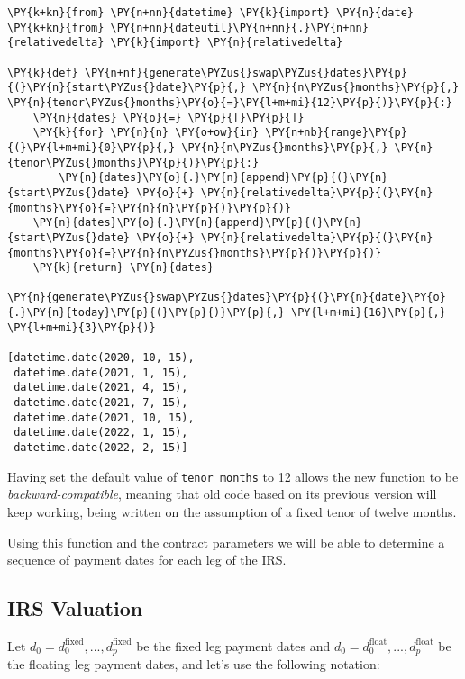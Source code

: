 \begin{codebox}[breakable, size=fbox, boxrule=1pt, pad at break*=1mm,colback=cellbackground, colframe=cellborder]
\begin{Verbatim}[commandchars=\\\{\}]
\PY{k+kn}{from} \PY{n+nn}{datetime} \PY{k}{import} \PY{n}{date}
\PY{k+kn}{from} \PY{n+nn}{dateutil}\PY{n+nn}{.}\PY{n+nn}{relativedelta} \PY{k}{import} \PY{n}{relativedelta}
    
\PY{k}{def} \PY{n+nf}{generate\PYZus{}swap\PYZus{}dates}\PY{p}{(}\PY{n}{start\PYZus{}date}\PY{p}{,} \PY{n}{n\PYZus{}months}\PY{p}{,} \PY{n}{tenor\PYZus{}months}\PY{o}{=}\PY{l+m+mi}{12}\PY{p}{)}\PY{p}{:}
    \PY{n}{dates} \PY{o}{=} \PY{p}{[}\PY{p}{]}
    \PY{k}{for} \PY{n}{n} \PY{o+ow}{in} \PY{n+nb}{range}\PY{p}{(}\PY{l+m+mi}{0}\PY{p}{,} \PY{n}{n\PYZus{}months}\PY{p}{,} \PY{n}{tenor\PYZus{}months}\PY{p}{)}\PY{p}{:}
        \PY{n}{dates}\PY{o}{.}\PY{n}{append}\PY{p}{(}\PY{n}{start\PYZus{}date} \PY{o}{+} \PY{n}{relativedelta}\PY{p}{(}\PY{n}{months}\PY{o}{=}\PY{n}{n}\PY{p}{)}\PY{p}{)}
    \PY{n}{dates}\PY{o}{.}\PY{n}{append}\PY{p}{(}\PY{n}{start\PYZus{}date} \PY{o}{+} \PY{n}{relativedelta}\PY{p}{(}\PY{n}{months}\PY{o}{=}\PY{n}{n\PYZus{}months}\PY{p}{)}\PY{p}{)}
    \PY{k}{return} \PY{n}{dates}

\PY{n}{generate\PYZus{}swap\PYZus{}dates}\PY{p}{(}\PY{n}{date}\PY{o}{.}\PY{n}{today}\PY{p}{(}\PY{p}{)}\PY{p}{,} \PY{l+m+mi}{16}\PY{p}{,} \PY{l+m+mi}{3}\PY{p}{)}

[datetime.date(2020, 10, 15),
 datetime.date(2021, 1, 15),
 datetime.date(2021, 4, 15),
 datetime.date(2021, 7, 15),
 datetime.date(2021, 10, 15),
 datetime.date(2022, 1, 15),
 datetime.date(2022, 2, 15)]
\end{Verbatim}
\end{codebox}
Having set the default value of \texttt{tenor\_months} to 12 allows the new function to be \emph{backward-compatible}, meaning that old code based on its previous version will keep working, being written on the assumption of a 
fixed tenor of twelve months. 
       
Using this function and the contract parameters we will be able to
determine a sequence of payment dates for each leg of the IRS.

\subsection{IRS Valuation}\label{irs-valuation}

Let \(d_0=d_0^{\mathrm{fixed}},...,d_p^{\mathrm{fixed}}\) be the fixed
leg payment dates and
\(d_0=d_0^{\mathrm{float}},...,d_p^{\mathrm{float}}\) be the floating
leg payment dates, and let's use the following notation:

